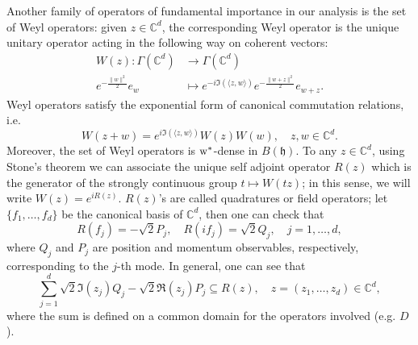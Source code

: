 \documentclass[preprint]{elsarticle}
\theoremstyle{definition}
\def\hh{\mathfrak{h} }
\def\CC{\mathbb{C}}
\def\FS{\Gamma(\CC^d)}
\def\hh{\mathfrak{h}}
\begin{document}
Another family of operators of fundamental importance in our analysis is the set of Weyl operators: given $z \in \CC^d$, the corresponding Weyl operator is the unique unitary operator acting in the following way on coherent vectors:
\begin{align} \label{eq:Wexpo}
W(z):\FS &\longrightarrow \FS\\
e^{-\frac{\|w\|^2}{2}}e_w &\longmapsto e^{-i\Im(\langle z,w \rangle)} e^{-\frac{\|w+z\|^2}{2}}e_{w+z}.
\end{align}
Weyl operators satisfy the exponential form of canonical commutation relations, i.e.
\begin{equation} \label{eq.expccr}
W(z+w)=e^{i\Im(\langle z,w \rangle)}W(z)W(w), \quad z,w \in \CC^d.
\end{equation}
Moreover, the set of Weyl operators is ${\rm w}^*$-dense in $B(\hh)$. To any $z \in \CC^d$, using Stone's theorem we can associate the unique self adjoint operator $R(z)$ which is the generator of the strongly continuous group $t \mapsto W(tz)$; in this sense, we will write $W(z)=e^{iR(z)}$. $R(z)$'s are called quadratures or field operators; let $\{f_1,\dots,f_d\}$ be the canonical basis of $\CC^d$, then one can check that
$$
R(f_j)=-\sqrt{2}P_j, \quad R(if_j)=\sqrt{2}Q_j, \quad j=1,\dots, d,$$
where $Q_j$ and $P_j$ are position and momentum observables, respectively, corresponding to the $j$-th mode. In general, one can see that
\begin{equation} \label{eq:fields}\sum_{j=1}^{d}\sqrt{2}\Im(z_j) Q_j-\sqrt{2}\Re(z_j) P_j\subseteq R(z), \quad z=(z_1,\dots, z_d) \in \CC^d,
\end{equation}
where the sum is defined on a common domain for the operators involved (e.g. $D$).
\end{document}
